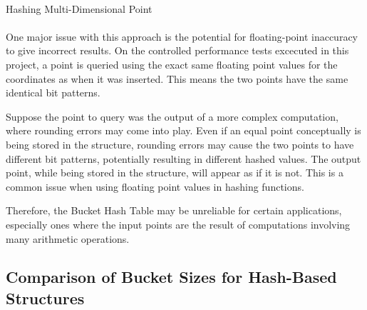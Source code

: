 \paragraph{}

\begin{algorithm}[H]
	\SetAlgoLined
	 

  	 {
	}

	\caption{Hashing Multi-Dimensional Point}
	\label{alg:point-hashing}
\end{algorithm}

\paragraph{}

One major issue with this approach is the potential for floating-point inaccuracy to give incorrect results. On the controlled performance tests excecuted in this project, a point is queried using the exact same floating point values for the coordinates as when it was inserted. This means the two points have the same identical bit patterns. 

Suppose the point to query was the output of a more complex computation, where rounding errors may come into play. Even if an equal point conceptually is being stored in the structure, rounding errors may cause the two points to have different bit patterns, potentially resulting in different hashed values. The output point, while being stored in the structure, will appear as if it is not. This is a common issue when using floating point values in hashing functions.

Therefore, the Bucket Hash Table may be unreliable for certain applications, especially ones where the input points are the result of computations involving many arithmetic operations.

\subsection{Comparison of Bucket Sizes for Hash-Based Structures}


